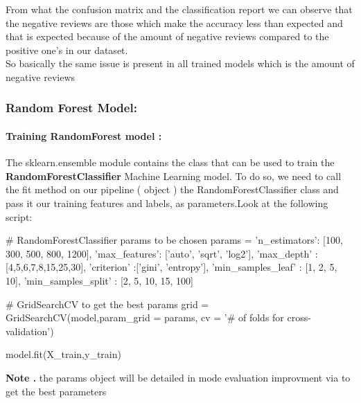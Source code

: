 \documentclass{article}
\begin{document}
From what the confusion matrix and the classification report we can observe that the negative reviews are those which make the accuracy less than expected and that is expected because of the amount of negative reviews compared to the positive one's in our dataset.\\
So basically the same issue is present in all trained models which is the amount of negative reviews

\newpage
\subsubsection{ Random Forest Model:}
\paragraph{ Training RandomForest model : }
The sklearn.ensemble module contains the  class that can be used to train the \textbf{RandomForestClassifier} Machine Learning model. To do so, we need to call the fit method on our pipeline  (  object ) the RandomForestClassifier class and pass it our training features and labels, as parameters.Look at the following script:
\begin{code}
# RandomForestClassifier params to be chosen
params = {
    'n_estimators': [100, 300, 500, 800, 1200],
    'max_features': ['auto', 'sqrt', 'log2'],
    'max_depth' : [4,5,6,7,8,15,25,30],
    'criterion' :['gini', 'entropy'],
    'min_samples_leaf' : [1, 2, 5, 10],
    'min_samples_split' : [2, 5, 10, 15, 100]
}

# GridSearchCV to get the best params
grid = GridSearchCV(model,param_grid = params, cv = '# of folds for cross-validation')

model.fit(X_train,y_train)
\end{code}

\textbf{Note .} the params object will be detailed in mode evaluation improvment via  to get the best parameters
\end{document}
